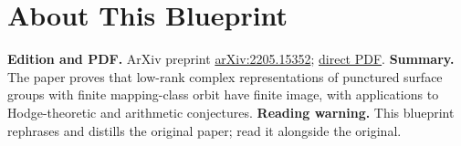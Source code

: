 

\chapter*{About This Blueprint}
\label{canonical-representations-surface-groups-about}

\textbf{Edition and PDF.} ArXiv preprint \href{https://arxiv.org/abs/2205.15352}{arXiv:2205.15352};
\href{https://arxiv.org/pdf/2205.15352}{direct PDF}.
\textbf{Summary.} The paper proves that low-rank complex representations of punctured surface groups with finite
mapping-class orbit have finite image, with applications to Hodge-theoretic and arithmetic conjectures.
\textbf{Reading warning.} This blueprint rephrases and distills the original paper; read it alongside the original.
















